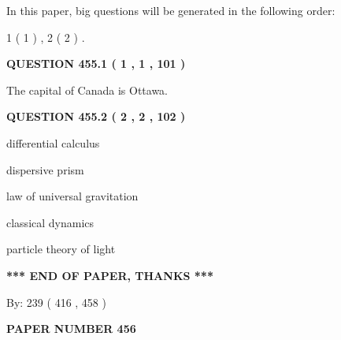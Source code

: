 \documentclass[12pt]{article}
\begin{document}
In this paper, big questions will be generated in the following order: 
   
   
   1 ( 1 )
 ,
   2 ( 2 )
 .
  
\vspace{0.2in}
  
{\textbf{\Large{QUESTION
455.1 
 ( 1 , 1 , 101 )
}}}
  
  
 
 
\noindent{}
 
 
The capital of Canada is Ottawa.
 
 
 
 
  
\vspace{0.2in}
  
{\textbf{\Large{QUESTION
455.2 
 ( 2 , 2 , 102 )
}}}
  
  
 
 
\noindent{}
 
 
differential calculus
 
 
dispersive prism
 
 
law of universal gravitation
 
 
classical dynamics
 
 
particle theory of light
 
 
 
 
   
   
\vspace{1.0in} 
{\textbf{\large{ *** END OF PAPER, THANKS *** }}} 
   
   
\hspace{1.0in} By: 
 239 ( 416 ,  458 )
   
   
   
   
\newpage 
\setcounter{page}{ 
   456001 } 
   
   
   
   
 {\textbf{ \Large{ PAPER NUMBER  456  }}}
   
   
\vspace{0.2in}
   
   
   
\end{document}
